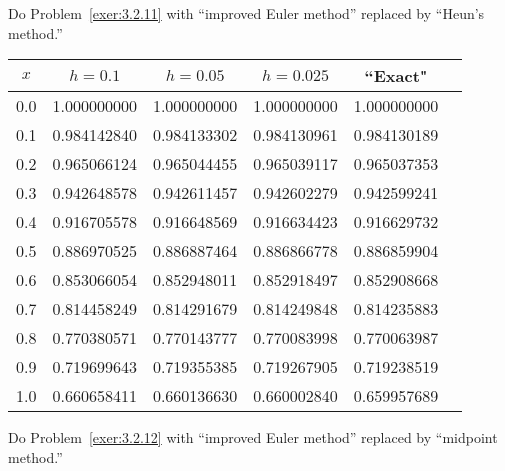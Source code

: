 \documentclass{ximera}
\begin{document}
\begin{problem}\label{exer:3.2.28} 
Do Problem~\ref{exer:3.2.11} with ``improved Euler method''
replaced by ``Heun's method.''

\begin{solution}
    {\small
\begin{tabular}{|c|r|r|r|r|r|}
\hline
\multicolumn{1}{|c|}{$x$}&
\multicolumn{1}{|c|}{$h=0.1$}&
\multicolumn{1}{|c|}{$h=0.05$}&
\multicolumn{1}{|c|}{$h=0.025$}&
\multicolumn{1}{|c|}{``Exact"}\\ \hline
0.0 & 1.000000000 & 1.000000000 & 1.000000000 & 1.000000000 \\
0.1 & 0.984142840 & 0.984133302 & 0.984130961 & 0.984130189 \\
0.2 & 0.965066124 & 0.965044455 & 0.965039117 & 0.965037353 \\
0.3 & 0.942648578 & 0.942611457 & 0.942602279 & 0.942599241 \\
0.4 & 0.916705578 & 0.916648569 & 0.916634423 & 0.916629732 \\
0.5 & 0.886970525 & 0.886887464 & 0.886866778 & 0.886859904 \\
0.6 & 0.853066054 & 0.852948011 & 0.852918497 & 0.852908668 \\
0.7 & 0.814458249 & 0.814291679 & 0.814249848 & 0.814235883 \\
0.8 & 0.770380571 & 0.770143777 & 0.770083998 & 0.770063987 \\
0.9 & 0.719699643 & 0.719355385 & 0.719267905 & 0.719238519 \\
1.0 & 0.660658411 & 0.660136630 & 0.660002840 & 0.659957689 \\
\hline
\end{tabular}}
\end{solution}
\end{problem}

\begin{problem}\label{exer:3.2.29}
Do Problem~\ref{exer:3.2.12} with ``improved Euler method''
replaced by ``midpoint method.''
\end{problem}
\end{document}
